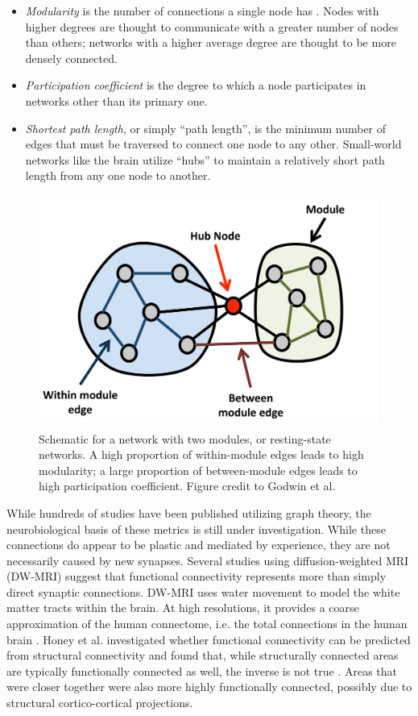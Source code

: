 \begin{itemize}
    \item \textit{Modularity} is the number of connections a single node has \citep{Sporns2013}. Nodes with higher degrees are thought to communicate with a greater number of nodes than others; networks with a higher average degree are thought to be more densely connected.  
    \item \textit{Participation coefficient} is the degree to which a node participates in networks other than its primary one.
    \item \textit{Shortest path length}, or simply ``path length'', is the minimum number of edges that must be traversed to connect one node to any other. Small-world networks like the brain utilize ``hubs'' to maintain a relatively short path length from any one node to another. 
\end{itemize}


\begin{figure}[t]
    \centering
    \includegraphics[height=3in]{images/ch1-graph-schema}
    \caption[Schematic for a network with two modules.]{Schematic for a network with two modules, or resting-state networks. A high proportion of within-module edges leads to high modularity; a large proportion of between-module edges leads to high participation coefficient. Figure credit to Godwin et al. \citep{Godwin2016}}
    \label{fig:ch1-graph-schema}
\end{figure}

While hundreds of studies have been published utilizing graph theory, the neurobiological basis of these metrics is still under investigation. While these connections do appear to be plastic and mediated by experience, they are not necessarily caused by new synapses. Several studies using diffusion-weighted MRI (DW-MRI) suggest that functional connectivity represents more than simply direct synaptic connections. DW-MRI uses water movement to model the white matter tracts within the brain. At high resolutions, it provides a coarse approximation of the human connectome, i.e. the total connections in the human brain \citep{Sporns2005}. Honey et al. investigated whether functional connectivity can be predicted from structural connectivity and found that, while structurally connected areas are typically functionally connected as well, the inverse is not true \citep{Honey2009}. Areas that were closer together were also more highly functionally connected, possibly due to structural cortico-cortical projections. 

